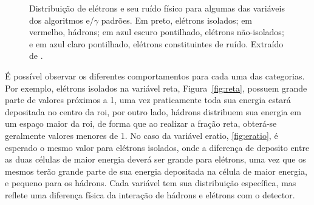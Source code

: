 \begin{figure}
{        }
\caption[Distribuição de elétrons e seu ruído físico para algumas das variáveis
dos algoritmos e/$\gamma$ padrões.]
{Distribuição de elétrons e seu ruído físico para algumas das variáveis
dos algoritmos e/$\gamma$ padrões. Em preto, elétrons isolados; em vermelho,
hádrons; em azul escuro pontilhado, elétrons não-isolados; e em azul claro
pontilhado, elétrons constituintes de ruído. Extraído de \cite{expected_perf_2011}.}
\label{fig:cortes_egamma_padrao}
\end{figure}

É possível observar os diferentes comportamentos para cada uma das
categorias. Por exemplo, elétrons isolados na variável \gls{reta},
Figura~\ref{fig:reta}, possuem grande parte de valores próximos a 1, 
uma vez praticamente toda sua energia estará depositada no centro da 
\gls{roi}, por outro lado, hádrons distribuem sua energia em um espaço maior da
\gls{roi}, de forma que ao realizar a fração \gls{reta}, obterá-se geralmente
valores menores de 1. No caso da variável
\gls{eratio}, \ref{fig:eratio}, é esperado o mesmo valor para elétrons isolados,
onde a diferença de deposito entre as duas células de maior
energia deverá ser grande para elétrons, uma vez que os mesmos terão grande parte 
de sua energia depositada na célula de maior energia, e pequeno para os hádrons. Cada variável
tem sua distribuição específica, mas reflete uma diferença física da interação
de hádrons e elétrons com o detector.



